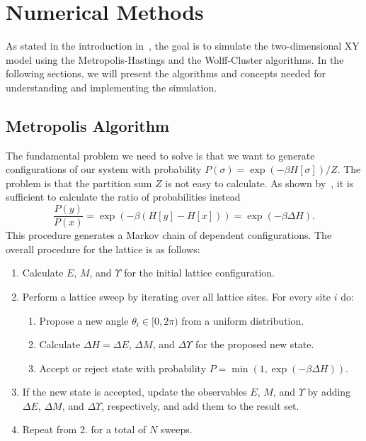 \section{Numerical Methods}\label{sec:theo:numerical_methods}
	As stated in the introduction in~, the goal is to simulate the two-dimensional XY model using the Metropolis-Hastings and the Wolff-Cluster algorithms. In the following sections, we will present the algorithms and concepts needed for understanding and implementing the simulation.

	\subsection{Metropolis Algorithm}\label{sec:theo:metropolis}
		The fundamental problem we need to solve is that we want to generate configurations of our system with probability $P(\sigma) = \exp{(-\beta H[\sigma])}/Z$. The problem is that the partition sum $Z$ is not easy to calculate. As shown by~\citet{metropolis}, it is sufficient to calculate the ratio of probabilities instead
		\begin{equation}
			\frac{P(y)}{P(x)} = \exp{(-\beta(H[y] - H[x]))} = \exp{(-\beta \Delta H)}.
		\end{equation}
		This procedure generates a Markov chain of dependent configurations. The overall procedure for the lattice is as follows:
		\begin{enumerate}
			\item Calculate $E$, $M$, and $\Upsilon$ for the initial lattice configuration.
			\item Perform a lattice sweep by iterating over all lattice sites. For every site $i$ do:
			\begin{enumerate}
				\item Propose a new angle $\theta_i \in [0,2\pi)$ from a uniform distribution.
				\item Calculate $\Delta H = \Delta E$, $\Delta M$, and $\Delta \Upsilon$ for the proposed new state.
				\item Accept or reject state with probability $P = \min{(1, \exp{(-\beta\Delta H)})}$.
			\end{enumerate}
			\item If the new state is accepted, update the observables $E$, $M$, and $\Upsilon$ by adding $\Delta E$, $\Delta M$, and $\Delta \Upsilon$, respectively, and add them to the result set.
			\item Repeat from 2. for a total of $N$ sweeps.
		\end{enumerate}
		
